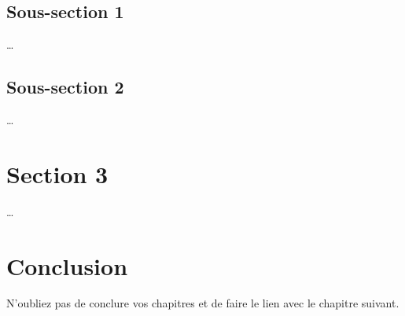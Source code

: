 \subsection{Sous-section 1}
\dots


\subsection{Sous-section 2}
\dots

\section{Section 3}
\dots

\section{Conclusion}
N'oubliez pas de conclure vos chapitres et de faire le lien avec le chapitre suivant.
